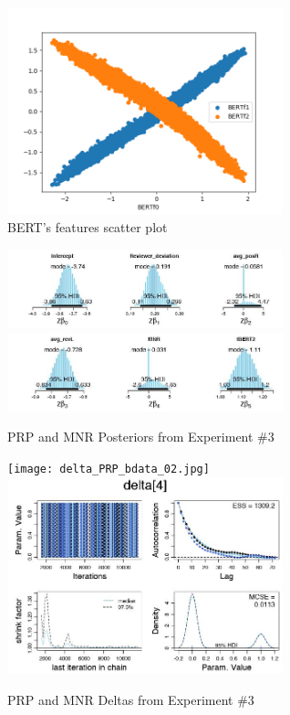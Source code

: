 \begin{figure}
\includegraphics[width=8cm]{BERTFeaturesScatterPlot.png}
\caption{BERT's features scatter plot}
\label{BERTf}
\end{figure}

\begin{figure}
\includegraphics[width=8cm]{posteriors_bdata_02.jpg}
\includegraphics[width=8cm]{pposteriors_bdata_02.jpg}
\caption{PRP and MNR Posteriors from Experiment \#3}
\label{PRP_MNR_Posteriors}
\end{figure}

\begin{figure}
\texttt{[image: delta\_PRP\_bdata\_02.jpg]}
\includegraphics[width=8cm]{delta_MNR_bdata_02.jpg}
\caption{PRP and MNR Deltas from Experiment \#3}
\label{PRP_MNR_Deltas}
\end{figure}

